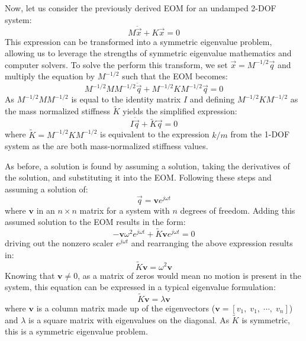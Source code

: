 \documentclass[12pt,letter]{article}
\begin{document}
	
	Now, let us consider the previously derived EOM for an undamped 2-DOF system:
	\begin{equation}
	M\ddot{\vec{x}} + K\vec{x} =0
	\end{equation}
	This expression can be transformed into a symmetric eigenvalue problem, allowing us to leverage the strengths of symmetric eigenvalue mathematics and computer solvers. To solve the perform this transform, we set $\vec{x}=M^{-1/2}\vec{q}$ and multiply the equation by $M^{-1/2}$ such that the EOM becomes:
	\begin{equation}
	M^{-1/2}MM^{-1/2}\ddot{\vec{q}} + M^{-1/2}KM^{-1/2}\vec{q} =0
	\end{equation}
	As $M^{-1/2}MM^{-1/2}$ is equal to the identity matrix $I$ and defining $M^{-1/2}KM^{-1/2}$ as the mass normalized stiffness $\widetilde{K}$ yields the simplified expression:
	\begin{equation}
	I\ddot{\vec{q}} + \widetilde{K}\vec{q} =0
	\end{equation}
	where $\widetilde{K}=M^{-1/2}KM^{-1/2}$ is equivalent to the expression $k/m$ from the 1-DOF system as the are both mass-normalized stiffness values. 
	
\pagebreak
	As before, a solution is found by assuming a solution, taking the derivatives of the solution, and substituting it into the EOM. Following these steps and assuming a solution of:
	\begin{equation}
	\vec{q} = \textbf{v}e^{j\omega t}
	\end{equation}
	where $\textbf{v}$ in an $n \times n$ matrix for a system with $n$ degrees of freedom. Adding this assumed solution to the EOM results in the form:
	\begin{equation}
	-\textbf{v} \omega^2 e^{j\omega t} + \widetilde{K}\textbf{v}e^{j\omega t} =0
	\end{equation}
	driving out the nonzero scaler $e^{j\omega t}$ and rearranging the above expression results in:
	\begin{equation}
	\widetilde{K}\textbf{v} =  \omega^2 \textbf{v}
	\end{equation}
	Knowing that $\textbf{v}\neq0$, as a matrix of zeros would mean no motion is present in the system, this equation can be expressed in a typical eigenvalue formulation:
	\begin{equation}
	\widetilde{K}\textbf{v} =  \lambda \textbf{v}
	\label{eq:eigenvalue_problem}
	\end{equation}
	where $\textbf{v}$ is a column matrix made up of the eigenvectors ($\textbf{v} = [v_1, \; v_1, \; \cdots, \; v_n ]$) and 
	$\lambda$ is a square matrix with eigenvalues on the diagonal. As $\widetilde{K}$ is symmetric, this is a symmetric eigenvalue problem. 
	
\end{document}
